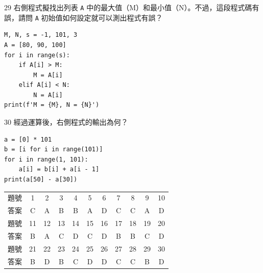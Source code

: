 \medskip

\begin{qbox}{29}
右側程式擬找出列表 \texttt{A} 中的最大值（M）和最小值（N）。不過，這段程式碼有誤，請問 \texttt{A} 初始值如何設定就可以測出程式有誤？

\begin{verbatim}
M, N, s = -1, 101, 3
A = [80, 90, 100]
for i in range(s):
    if A[i] > M:
        M = A[i]
    elif A[i] < N:
        N = A[i]
print(f'M = {M}, N = {N}')
\end{verbatim}

\qchoices{\text{[90, 80, 100]}}{\text{[80, 90, 100]}}{\text{[100, 90, 80]}}{\text{[90, 100, 80]}}
\end{qbox}

\medskip

\begin{qbox}{30}
經過運算後，右側程式的輸出為何？

\begin{verbatim}
a = [0] * 101
b = [i for i in range(101)]
for i in range(1, 101):
    a[i] = b[i] + a[i - 1]
print(a[50] - a[30])
\end{verbatim}

\end{qbox}

\bigskip

\begin{center}
\small
\begin{tabular}{ccccccccccc}
\toprule
題號 & 1 & 2 & 3 & 4 & 5 & 6 & 7 & 8 & 9 & 10 \\
答案 & C & A & B & B & A & D & C & C & A & D \\
\midrule
題號 & 11 & 12 & 13 & 14 & 15 & 16 & 17 & 18 & 19 & 20 \\
答案 & B & A & C & D & C & D & B & B & C & D \\
\midrule
題號 & 21 & 22 & 23 & 24 & 25 & 26 & 27 & 28 & 29 & 30 \\
答案 & B & D & B & C & D & D & C & C & B & D \\
\bottomrule
\end{tabular}
\end{center}
